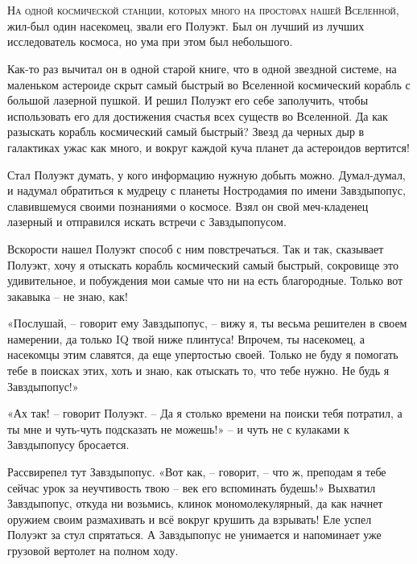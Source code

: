 \documentclass[ebook,oneside,final,openright]{memoir}
\begin{document}
\chapter{}
 \lettrine{Н}{а одной космической станции, которых много на просторах нашей Вселенной,} жил-был один насекомец, звали его Полуэкт. Был он лучший из лучших исследователь космоса, но ума при этом был небольшого.\par
\par
Как-то раз вычитал он в одной старой книге, что в одной звездной системе, на маленьком астероиде скрыт самый быстрый во Вселенной космический корабль с большой лазерной пушкой. И решил Полуэкт его себе заполучить, чтобы использовать его для достижения счастья всех существ во Вселенной. Да как разыскать корабль космический самый быстрый? Звезд да черных дыр в галактиках ужас как много, и вокруг каждой куча планет да астероидов вертится!\par
\par
Стал Полуэкт думать, у кого информацию нужную добыть можно. Думал-думал, и надумал обратиться к мудрецу с планеты Ностродамия по имени Завздыпопус, славившемуся своими познаниями о космосе. Взял он свой меч-кладенец лазерный и отправился искать встречи с Завздыпопусом.\par
\par
Вскорости нашел Полуэкт способ с ним повстречаться. Так и так, сказывает Полуэкт, хочу я отыскать корабль космический самый быстрый, сокровище это удивительное, и побуждения мои самые что ни на есть благородные. Только вот закавыка – не знаю, как!\par
\par
«Послушай, – говорит ему Завздыпопус, – вижу я, ты весьма решителен в своем намерении, да только IQ твой ниже плинтуса! Впрочем, ты насекомец, а насекомцы этим славятся, да еще упертостью своей. Только не буду я помогать тебе в поисках этих, хоть и знаю, как отыскать то, что тебе нужно. Не будь я Завздыпопус!» \par
\par
«Ах так! – говорит Полуэкт. – Да я столько времени на поиски тебя потратил, а ты мне и чуть-чуть подсказать не можешь!» – и чуть не с кулаками к Завздыпопусу бросается. \par
\par
Рассвирепел тут Завздыпопус. «Вот как, – говорит, – что ж, преподам я тебе сейчас урок за неучтивость твою – век его вспоминать будешь!» Выхватил Завздыпопус, откуда ни возьмись, клинок мономолекулярный, да как начнет оружием своим размахивать и всё вокруг крушить да взрывать! Еле успел Полуэкт за стул спрятаться. А Завздыпопус не унимается и напоминает уже грузовой вертолет на полном ходу. \par
\end{document}
